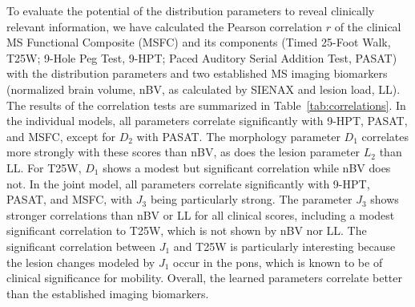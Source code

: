 To evaluate the potential of the distribution parameters to reveal clinically
relevant information, we have calculated the Pearson correlation $r$ of the
clinical MS Functional Composite (MSFC) \cite{Fischer1999} and its components
(Timed 25-Foot Walk, T25W; 9-Hole Peg Test, 9-HPT; Paced Auditory Serial
Addition Test, PASAT) with the distribution parameters and two established MS
imaging biomarkers (normalized brain volume, nBV, as calculated by SIENAX
\cite{Smith2002} and lesion load, LL). The results of the correlation tests are
summarized in Table~\ref{tab:correlations}. In the individual models, all
parameters correlate significantly with 9-HPT, PASAT, and MSFC, except for $D_2$
with PASAT. The morphology parameter $D_1$ correlates more strongly with these
scores than nBV, as does the lesion parameter $L_2$ than LL. For T25W, $D_1$
shows a modest but significant correlation while nBV does not. In the joint
model, all parameters correlate significantly with 9-HPT, PASAT, and MSFC, with
$J_3$ being particularly strong. The parameter $J_3$ shows stronger correlations
than nBV or LL for all clinical scores, including a modest significant
correlation to T25W, which is not shown by nBV nor LL. The significant
correlation between $J_1$ and T25W is particularly interesting because the
lesion changes modeled by $J_1$ occur in the pons, which is known to be of
clinical significance for mobility. Overall, the learned parameters correlate
better than the established imaging biomarkers.


